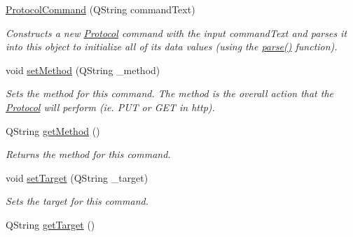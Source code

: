 \begin{DoxyCompactItemize}
\item 
\hypertarget{struct_picto_1_1_protocol_command_adbd18862073b5ed072eade60773968cc}{\hyperlink{struct_picto_1_1_protocol_command_adbd18862073b5ed072eade60773968cc}{Protocol\-Command} (Q\-String command\-Text)}\label{struct_picto_1_1_protocol_command_adbd18862073b5ed072eade60773968cc}

\begin{DoxyCompactList}\small\item\em Constructs a new \hyperlink{struct_picto_1_1_protocol}{Protocol} command with the input command\-Text and parses it into this object to initialize all of its data values (using the \hyperlink{struct_picto_1_1_protocol_command_ad86a5f2aec553f620cebd5072c8a29d3}{parse()} function). \end{DoxyCompactList}\item 
\hypertarget{struct_picto_1_1_protocol_command_a0487b798662b4139c888332884bf2490}{void \hyperlink{struct_picto_1_1_protocol_command_a0487b798662b4139c888332884bf2490}{set\-Method} (Q\-String \-\_\-method)}\label{struct_picto_1_1_protocol_command_a0487b798662b4139c888332884bf2490}

\begin{DoxyCompactList}\small\item\em Sets the method for this command. The method is the overall action that the \hyperlink{struct_picto_1_1_protocol}{Protocol} will perform (ie. P\-U\-T or G\-E\-T in http). \end{DoxyCompactList}\item 
Q\-String \hyperlink{struct_picto_1_1_protocol_command_a0c277e402e007a6b6aa0dcbbe2ccce17}{get\-Method} ()
\begin{DoxyCompactList}\small\item\em Returns the method for this command. \end{DoxyCompactList}\item 
\hypertarget{struct_picto_1_1_protocol_command_af1835a8f822695ab9936158c689f559c}{void \hyperlink{struct_picto_1_1_protocol_command_af1835a8f822695ab9936158c689f559c}{set\-Target} (Q\-String \-\_\-target)}\label{struct_picto_1_1_protocol_command_af1835a8f822695ab9936158c689f559c}

\begin{DoxyCompactList}\small\item\em Sets the target for this command. \end{DoxyCompactList}\item 
\hypertarget{struct_picto_1_1_protocol_command_a31121c5431c5d34acfdd1ea795b020dd}{Q\-String \hyperlink{struct_picto_1_1_protocol_command_a31121c5431c5d34acfdd1ea795b020dd}{get\-Target} ()}\label{struct_picto_1_1_protocol_command_a31121c5431c5d34acfdd1ea795b020dd}


\end{DoxyCompactItemize}
